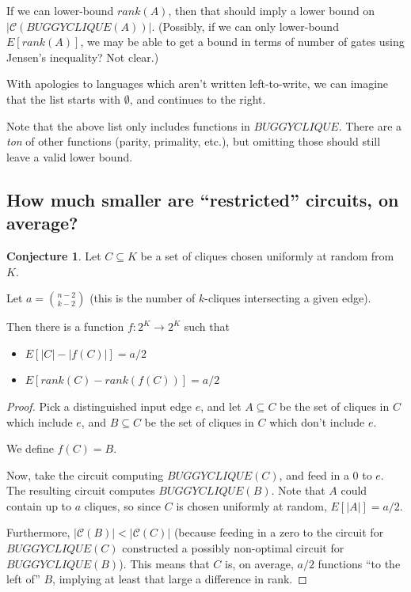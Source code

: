 \documentclass[12pt]{article}
\theoremstyle{definition}
\newtheorem{conj}{Conjecture}[section]
\newcommand{\bigC}[0]{\mathcal{C}}
\begin{document}
If we can lower-bound $rank(A)$, then that should imply a
lower bound on $|\bigC(BUGGYCLIQUE(A))|$. (Possibly, if we
can only lower-bound $E[rank(A)]$, we may be able to get
a bound in terms of number of gates using Jensen's inequality?
Not clear.)

With apologies to languages which aren't written left-to-write,
we can imagine that the list starts with $\emptyset$, and
continues to the right.

Note that the above list only includes functions in $BUGGYCLIQUE$.
There are a {\em ton} of other functions (parity, primality, etc.), but omitting
those should still leave a valid lower bound.

\subsection{How much smaller are ``restricted'' circuits, on average?}


\begin{conj}
\label{vaguelyUpward}
Let $C \subseteq K$ be a set of cliques chosen uniformly at random
from $K$.

Let $a = {n-2 \choose k-2}$ (this is the number of $k$-cliques
intersecting a given edge).

Then there is a function $f: 2^K \rightarrow 2^K$ such that
\begin{itemize}

\item $E[|C| - |f(C)|] = a/2$

\item $E[rank(C) - rank(f(C))] = a/2$

\end{itemize}

\end{conj}
\begin{proof}

Pick a distinguished input edge $e$, and let $A \subseteq C$ be
the set of cliques in $C$ which include $e$, and $B \subseteq C$ be
the set of cliques in $C$ which don't include $e$.

We define $f(C) = B$.

Now, take the circuit computing $BUGGYCLIQUE(C)$, and
feed in a 0 to $e$. The resulting circuit computes
$BUGGYCLIQUE(B)$. Note that $A$ could contain up to $a$
cliques, so since $C$ is chosen uniformly at random,
$E[|A|] = a/2$.

Furthermore, $|\bigC(B)| < |\bigC(C)|$ (because feeding in
a zero to the circuit for $BUGGYCLIQUE(C)$ constructed a
possibly non-optimal circuit for $BUGGYCLIQUE(B)$).
 This means that
$C$ is, on average, $a/2$ functions ``to the left of'' $B$,
implying at least that large a difference in rank.

\end{proof}
\end{document}
